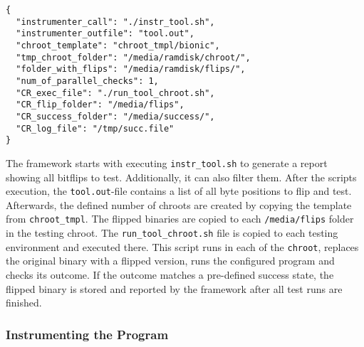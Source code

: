 \begin{minipage}{\linewidth}
\begin{lstlisting}[style=nasm,
                   caption={JSON style config file for the framework, showing
all parameters used to tweak each part of the framework. Entries
starting with \texttt{CR\_} are used inside the testing \texttt{chroot}.},
                   label={lst:expconfig}]
{
  "instrumenter_call": "./instr_tool.sh",
  "instrumenter_outfile": "tool.out",
  "chroot_template": "chroot_tmpl/bionic",
  "tmp_chroot_folder": "/media/ramdisk/chroot/",
  "folder_with_flips": "/media/ramdisk/flips/",
  "num_of_parallel_checks": 1,
  "CR_exec_file": "./run_tool_chroot.sh",
  "CR_flip_folder": "/media/flips",
  "CR_success_folder": "/media/success/",
  "CR_log_file": "/tmp/succ.file"
}
\end{lstlisting}
\end{minipage}

The framework starts with executing \texttt{instr\_tool.sh} to generate a report
showing all bitflips to test. Additionally, it can also filter them. After the
script\textquotesingle s execution, the \texttt{tool.out}-file contains a list
of all byte positions to flip and test. Afterwards, the defined number of
chroots are created by copying the template from \texttt{chroot\_tmpl}. The
flipped binaries are copied to each \texttt{/media/flips} folder in the testing
chroot. The \texttt{run\_tool\_chroot.sh} file is copied to each testing
environment and executed there. This script runs in each of the \texttt{chroot},
replaces the original binary with a flipped version, runs the configured program
and checks it\textquotesingle s outcome. If the outcome matches a pre-defined
success state, the flipped binary is stored and reported by the framework after
all test runs are finished.

\subsubsection{Instrumenting the Program}

